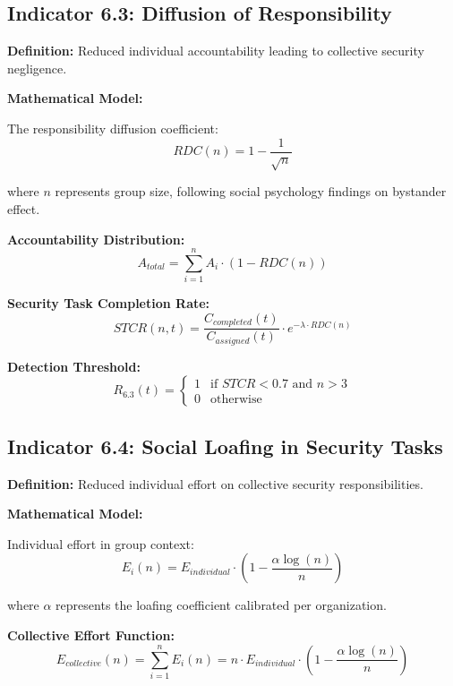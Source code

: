 \documentclass[11pt,a4paper]{article}
\begin{document}
\subsection{Indicator 6.3: Diffusion of Responsibility}

\textbf{Definition:} Reduced individual accountability leading to collective security negligence.

\textbf{Mathematical Model:}

The responsibility diffusion coefficient:
\begin{equation}
RDC(n) = 1 - \frac{1}{\sqrt{n}}
\end{equation}

where $n$ represents group size, following social psychology findings on bystander effect.

\textbf{Accountability Distribution:}
\begin{equation}
A_{total} = \sum_{i=1}^n A_i \cdot (1 - RDC(n))
\end{equation}

\textbf{Security Task Completion Rate:}
\begin{equation}
STCR(n,t) = \frac{C_{completed}(t)}{C_{assigned}(t)} \cdot e^{-\lambda \cdot RDC(n)}
\end{equation}

\textbf{Detection Threshold:}
\begin{equation}
R_{6.3}(t) = \begin{cases}
1 & \text{if } STCR < 0.7 \text{ and } n > 3 \\
0 & \text{otherwise}
\end{cases}
\end{equation}

\subsection{Indicator 6.4: Social Loafing in Security Tasks}

\textbf{Definition:} Reduced individual effort on collective security responsibilities.

\textbf{Mathematical Model:}

Individual effort in group context:
\begin{equation}
E_i(n) = E_{individual} \cdot \left(1 - \frac{\alpha \log(n)}{n}\right)
\end{equation}

where $\alpha$ represents the loafing coefficient calibrated per organization.

\textbf{Collective Effort Function:}
\begin{equation}
E_{collective}(n) = \sum_{i=1}^n E_i(n) = n \cdot E_{individual} \cdot \left(1 - \frac{\alpha \log(n)}{n}\right)
\end{equation}
\end{document}
